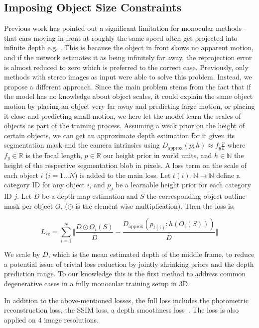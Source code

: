 \documentclass[10pt,twocolumn,letterpaper]{article}
\begin{document}
\subsection{Imposing Object Size Constraints}
Previous work has pointed out a significant limitation for monocular methods \cite{godard2018digging} \cite{yang2018every} \cite{wang2018learning} - that cars moving in front at roughly the same speed often get projected into infinite depth e.g. \cite{godard2018digging,yang2018every}. This is because the object in front shows no apparent motion, and if the network estimates it as being infinitely far away, the reprojection error is almost reduced to zero which is preferred to the correct case.
Previously, only methods with stereo images as input were able to solve this problem. Instead, we propose a different approach. Since the main problem stems from the fact that if the model has no knowledge about object scales, it could explain the same object motion by placing an object very far away and predicting large motion, or placing it close and predicting small motion, we here let the model learn the scales of objects as part of the training process. Assuming a weak prior on the height of certain objects, we can get an approximate depth estimation for it given its segmentation mask and the camera intrinsics using $D_{\text{approx}}(p;h)\approx f_y \frac{p}{h}$ where $f_y\in \mathbb{R}$ is the focal length, $p\in \mathbb{R}$ our height prior in world units, and $h\in \mathbb{N}$ the height of the respective segmentation blob in pixels. A loss term on the scale of each object $i$ ($i=1\dots N$) is added to the main loss. Let $t(i): \mathbb{N}\rightarrow \mathbb{N}$ define a category ID for any object $i$, and $p_j$ be a learnable height prior for each category ID $j$. Let $D$ be a depth map estimation and $S$ the corresponding object outline mask per object $O_i$ ($\odot$ is the element-wise multiplication). Then the loss is:

$$L_{sc}=\sum_{i=1}^{N} \Vert \frac{D \odot O_i(S)}{\overline{D}}-\frac{D_{\text{approx}}(p_{t(i)}; h(O_i(S)))}{\overline{D}}\Vert$$

\noindent We scale by $\overline{D}$, which is the mean estimated depth of the middle frame, to reduce a potential issue of trivial loss reduction by jointly shrinking priors and the depth prediction range.
To our knowledge this is the first method to address common degenerative cases in a fully monocular training setup in 3D.

In addition to the above-mentioned losses, the full loss includes the photometric reconstruction loss, the SSIM loss, a depth smoothness loss~\cite{zhou2017unsupervised,wang2018learning}. The loss is also applied on $4$ image resolutions.
\end{document}
